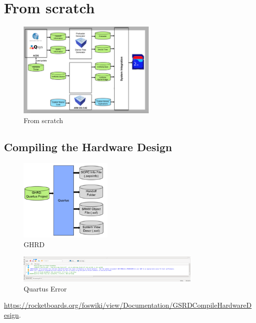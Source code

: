\clearpage
\section{From scratch}
\label{Fromscratch}

\begin{figure}[h]
	\centering		\includegraphics[width=0.6\textwidth]{img/fromscratch}
	\caption{From scratch}
    	\label{fig:fromscratch}
\end{figure}

\subsection{Compiling the Hardware Design}
\begin{figure}[h]
	\centering		\includegraphics[width=0.4\textwidth]{img/ghrd}
	\caption{GHRD}
    	\label{fig:ghrd}
\end{figure}

\begin{figure}[h]
	\centering		\includegraphics[width=0.8\textwidth]{img/quartuserror}
	\caption{Quartus Error}
    	\label{fig:quartuserror}
\end{figure}


\url{https://rocketboards.org/foswiki/view/Documentation/GSRDCompileHardwareDesign}.

